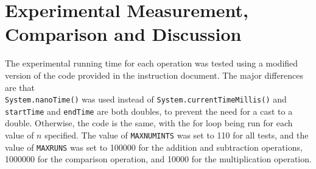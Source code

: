 \documentclass[12pt]{article}
\newcommand{\code}[1]{\texttt{#1}}
\begin{document}
\section*{Experimental Measurement, Comparison and Discussion}
The experimental running time for each operation was tested using a modified version of the code provided in the instruction document. The major differences are that \\ \code{System.nanoTime()} was used instead of \code{System.currentTimeMillis()} and \code{startTime} and \code{endTime} are both doubles, to prevent the need for a cast to a double. Otherwise, the code is the same, with the for loop being run for each value of $n$ specified. The value of \code{MAXNUMINTS} was set to 110 for all tests, and the value of \code{MAXRUNS} was set to 100000 for the addition and subtraction operations, 1000000 for the comparison operation, and 10000 for the multiplication operation.
\end{document}
